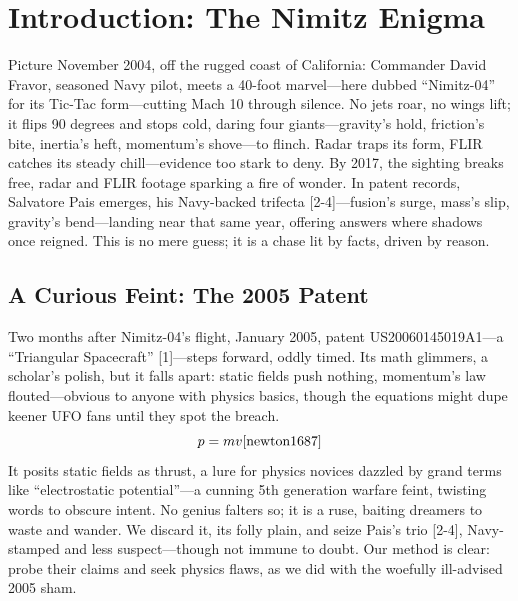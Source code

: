 \documentclass[11pt]{article}
\begin{document}
	\section{Introduction: The Nimitz Enigma}
	Picture November 2004, off the rugged coast of California: Commander David Fravor, seasoned Navy pilot, meets a 40-foot marvel—here dubbed “Nimitz-04” for its Tic-Tac form—cutting Mach 10 through silence. No jets roar, no wings lift; it flips 90 degrees and stops cold, daring four giants—gravity's hold, friction's bite, inertia's heft, momentum's shove—to flinch. Radar traps its form, FLIR catches its steady chill—evidence too stark to deny. By 2017, the sighting breaks free, radar and FLIR footage sparking a fire of wonder. In patent records, Salvatore Pais emerges, his Navy-backed trifecta [2-4]—fusion's surge, mass's slip, gravity's bend—landing near that same year, offering answers where shadows once reigned. This is no mere guess; it is a chase lit by facts, driven by reason.
	
	\subsection{A Curious Feint: The 2005 Patent}
	Two months after Nimitz-04's flight, January 2005, patent US20060145019A1—a “Triangular Spacecraft” [1]—steps forward, oddly timed. Its math glimmers, a scholar's polish, but it falls apart: static fields push nothing, momentum's law flouted—obvious to anyone with physics basics, though the equations might dupe keener UFO fans until they spot the breach.
	\begin{equation}
		p = mv \cite{newton1687}
	\end{equation}
	It posits static fields as thrust, a lure for physics novices dazzled by grand terms like “electrostatic potential”—a cunning 5th generation warfare feint, twisting words to obscure intent. No genius falters so; it is a ruse, baiting dreamers to waste and wander. We discard it, its folly plain, and seize Pais's trio [2-4], Navy-stamped and less suspect—though not immune to doubt. Our method is clear: probe their claims and seek physics flaws, as we did with the woefully ill-advised 2005 sham.
	
\end{document}
